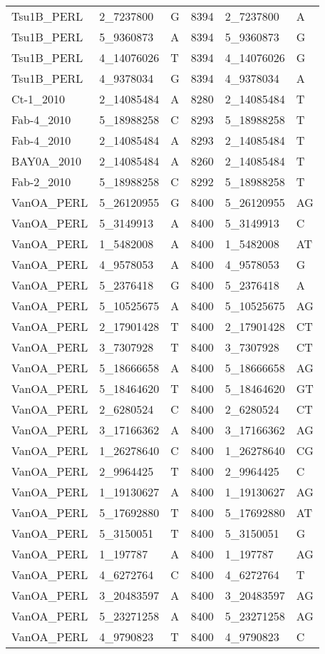 \begin{center}
\begin{longtable}{|l|l|l|l|l|l|}
Tsu1B\_PERL&2\_7237800&G&8394&2\_7237800&A\\
Tsu1B\_PERL&5\_9360873&A&8394&5\_9360873&G\\
Tsu1B\_PERL&4\_14076026&T&8394&4\_14076026&G\\
Tsu1B\_PERL&4\_9378034&G&8394&4\_9378034&A\\
Ct-1\_2010&2\_14085484&A&8280&2\_14085484&T\\
Fab-4\_2010&5\_18988258&C&8293&5\_18988258&T\\
Fab-4\_2010&2\_14085484&A&8293&2\_14085484&T\\
BAY0A\_2010&2\_14085484&A&8260&2\_14085484&T\\
Fab-2\_2010&5\_18988258&C&8292&5\_18988258&T\\
VanOA\_PERL&5\_26120955&G&8400&5\_26120955&AG\\
VanOA\_PERL&5\_3149913&A&8400&5\_3149913&C\\
VanOA\_PERL&1\_5482008&A&8400&1\_5482008&AT\\
VanOA\_PERL&4\_9578053&A&8400&4\_9578053&G\\
VanOA\_PERL&5\_2376418&G&8400&5\_2376418&A\\
VanOA\_PERL&5\_10525675&A&8400&5\_10525675&AG\\
VanOA\_PERL&2\_17901428&T&8400&2\_17901428&CT\\
VanOA\_PERL&3\_7307928&T&8400&3\_7307928&CT\\
VanOA\_PERL&5\_18666658&A&8400&5\_18666658&AG\\
VanOA\_PERL&5\_18464620&T&8400&5\_18464620&GT\\
VanOA\_PERL&2\_6280524&C&8400&2\_6280524&CT\\
VanOA\_PERL&3\_17166362&A&8400&3\_17166362&AG\\
VanOA\_PERL&1\_26278640&C&8400&1\_26278640&CG\\
VanOA\_PERL&2\_9964425&T&8400&2\_9964425&C\\
VanOA\_PERL&1\_19130627&A&8400&1\_19130627&AG\\
VanOA\_PERL&5\_17692880&T&8400&5\_17692880&AT\\
VanOA\_PERL&5\_3150051&T&8400&5\_3150051&G\\
VanOA\_PERL&1\_197787&A&8400&1\_197787&AG\\
VanOA\_PERL&4\_6272764&C&8400&4\_6272764&T\\
VanOA\_PERL&3\_20483597&A&8400&3\_20483597&AG\\
VanOA\_PERL&5\_23271258&A&8400&5\_23271258&AG\\
VanOA\_PERL&4\_9790823&T&8400&4\_9790823&C\\

\end{longtable}
\end{center}
